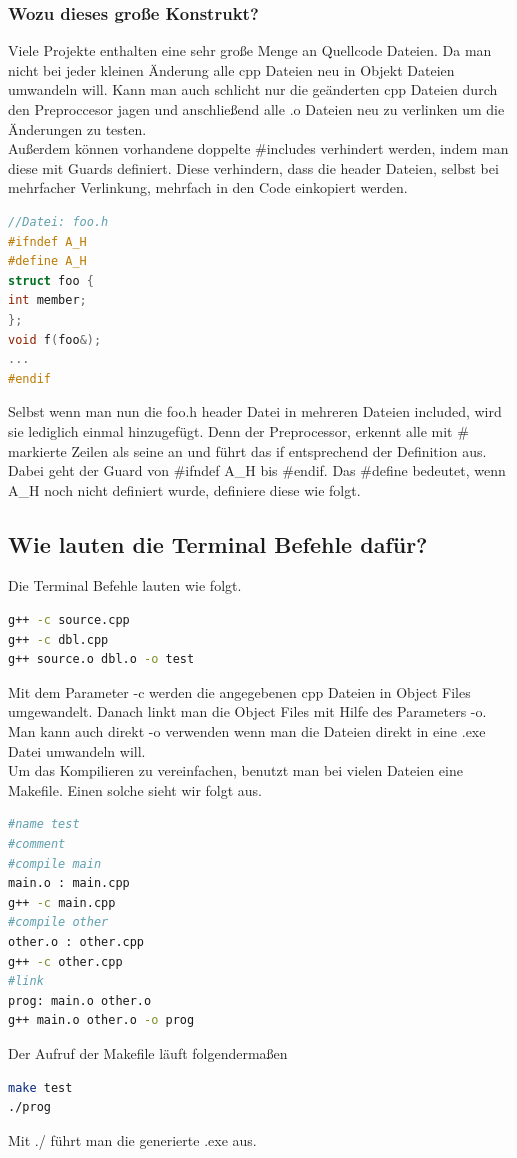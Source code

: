 \subsubsection{Wozu dieses große Konstrukt?}
Viele Projekte enthalten eine sehr große Menge an Quellcode Dateien. Da man nicht bei jeder kleinen Änderung alle cpp Dateien neu in Objekt Dateien umwandeln will. Kann man auch schlicht nur die geänderten cpp Dateien durch den Preproccesor jagen und anschließend alle .o Dateien neu zu verlinken um die Änderungen zu testen. \\
Außerdem können vorhandene doppelte \#includes verhindert werden, indem man diese mit Guards definiert. Diese verhindern, dass die header Dateien, selbst bei mehrfacher Verlinkung, mehrfach in den Code einkopiert werden. \newpage
\begin{lstlisting}[language=C++]  
//Datei: foo.h
#ifndef A_H
#define A_H
struct foo {
int member;
};
void f(foo&);
...
#endif
\end{lstlisting}
Selbst wenn man nun die foo.h header Datei in mehreren Dateien included, wird sie lediglich einmal hinzugefügt. Denn der Preprocessor, erkennt alle mit \# markierte Zeilen als seine an und führt das if entsprechend der Definition aus. Dabei geht der Guard von \#ifndef A\_H bis \#endif. Das \#define bedeutet, wenn A\_H noch nicht definiert wurde, definiere diese wie folgt. \\
\subsection{Wie lauten die Terminal Befehle dafür?} 
Die Terminal Befehle lauten wie folgt. 
\begin{lstlisting}[language=bash]
g++ -c source.cpp 
g++ -c dbl.cpp 
g++ source.o dbl.o -o test 
\end{lstlisting}
Mit dem Parameter -c werden die angegebenen cpp Dateien in Object Files umgewandelt. Danach linkt man die Object Files mit Hilfe des Parameters -o. Man kann auch direkt -o verwenden wenn man die Dateien direkt in eine .exe Datei umwandeln will.\\
Um das Kompilieren zu vereinfachen, benutzt man bei vielen Dateien eine Makefile. Einen solche sieht wir folgt aus. 
\begin{lstlisting}[language=bash]
#name test
#comment
#compile main 
main.o : main.cpp 
g++ -c main.cpp 
#compile other 
other.o : other.cpp 
g++ -c other.cpp 
#link 
prog: main.o other.o 
g++ main.o other.o -o prog 
\end{lstlisting}
Der Aufruf der Makefile läuft folgendermaßen
\begin{lstlisting}[language=bash]
make test
./prog 
\end{lstlisting}
Mit ./ führt man die generierte .exe aus.
\newpage 
